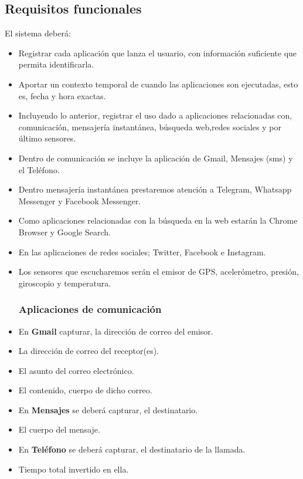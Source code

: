 \documentclass[12pt,a4paper,oneside]{book} %
\begin{document}
\subsection{Requisitos funcionales}
El sistema deberá: 
\begin{itemize}
  \item Registrar cada aplicación que lanza el usuario, con información suficiente que permita identificarla. 
  \item Aportar un contexto temporal de cuando las aplicaciones son ejecutadas, esto es, fecha y hora exactas. 
  \item Incluyendo lo anterior, registrar el uso dado a aplicaciones relacionadas con, comunicación, mensajería instantánea, búsqueda web,redes sociales y por último sensores. 
  \item Dentro de comunicación se incluye la aplicación de Gmail, Mensajes (sms) y el Teléfono. 
  \item Dentro mensajería instantánea prestaremos atención a Telegram, Whatsapp Messenger y Facebook Messenger. 
  \item Como aplicaciones relacionadas con la búsqueda en la web estarán la Chrome Browser y Google Search. 
  \item En las aplicaciones de redes sociales; Twitter, Facebook e Instagram.
  \item Los sensores que escucharemos serán el emisor de GPS, acelerómetro, presión, giroscopio y temperatura.
\subsubsection{Aplicaciones de comunicación}
  \item En  \textbf{Gmail} capturar, la dirección de correo del emisor. 
  \item La dirección de correo del receptor(es). 
  \item El asunto del correo electrónico. 
  \item El contenido, cuerpo de dicho correo. 
  \item En \textbf{Mensajes} se deberá capturar, el destinatario. 
  \item El cuerpo del mensaje. 
  \item En \textbf{Teléfono} se deberá capturar, el destinatario de la llamada. 
  \item Tiempo total invertido en ella. 

\end{itemize}
\end{document}
